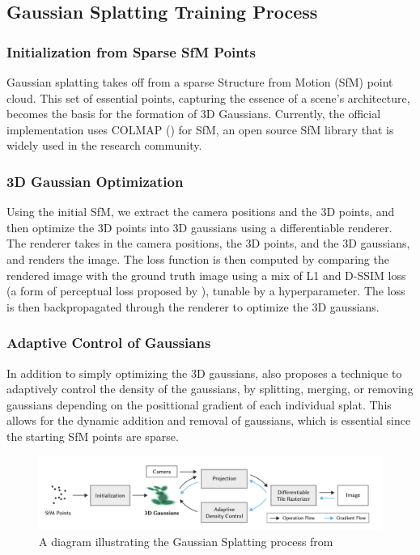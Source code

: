 \documentclass[logo,bsc,singlespacing,parskip]{infthesis}
\begin{document}
\subsection{Gaussian Splatting Training Process}

\subsubsection{Initialization from Sparse SfM Points}
Gaussian splatting takes off from a sparse Structure from Motion (SfM) point cloud. This set of essential points, capturing the essence of a scene's architecture, becomes the basis for the formation of 3D Gaussians. Currently, the official implementation uses COLMAP (\cite{colmap}) for SfM, an open source SfM library that is widely used in the research community.

\subsubsection{3D Gaussian Optimization}
Using the initial SfM, we extract the camera positions and the 3D points, and then optimize the 3D points into 3D gaussians using a differentiable renderer. The renderer takes in the camera positions, the 3D points, and the 3D gaussians, and renders the image. The loss function is then computed by comparing the rendered image with the ground truth image using a mix of L1 and D-SSIM loss (a form of perceptual loss proposed by \cite{dssim}), tunable by a hyperparameter. The loss is then backpropagated through the renderer to optimize the 3D gaussians.

\subsubsection{Adaptive Control of Gaussians}
In addition to simply optimizing the 3D gaussians, \cite{splat} also proposes a technique to adaptively control the density of the gaussians, by splitting, merging, or removing gaussians depending on the posittional gradient of each individual splat. This allows for the dynamic addition and removal of gaussians, which is essential since the starting SfM points are sparse.

\begin{figure}[h!]
\centering
\includegraphics[width=\textwidth]{images/gs_process.png}
\caption{A diagram illustrating the Gaussian Splatting process from \cite{splat}}
\label{fig:gaussiansplatting}
\end{figure}
\end{document}
